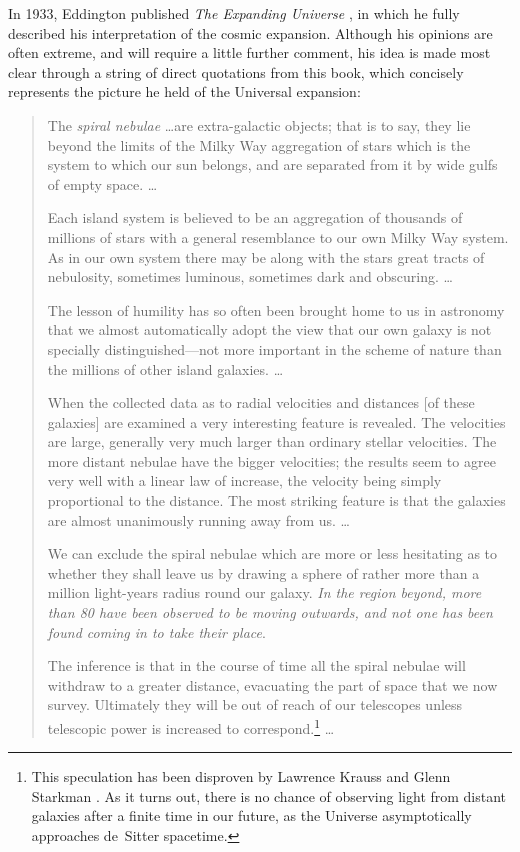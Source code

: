 In 1933, Eddington published \textit{The Expanding Universe} \cite{Eddington1933}, in which he fully described his interpretation of the cosmic expansion. Although his opinions are often extreme, and will require a little further comment, his idea is made most clear through a string of direct quotations from this book, which concisely represents the picture he held of the Universal expansion:
\begin{quotation}
The \textit{spiral nebulae} \ldots are extra-galactic objects; that is to say, they lie beyond the limits of the Milky Way aggregation of stars which is the system to which our sun belongs, and are separated from it by wide gulfs of empty space. \ldots

Each island system is believed to be an aggregation of thousands of millions of stars with a general resemblance to our own Milky Way system. As in our own system there may be along with the stars great tracts of nebulosity, sometimes luminous, sometimes dark and obscuring. \ldots

The lesson of humility has so often been brought home to us in astronomy that we almost automatically adopt the view that our own galaxy is not specially distinguished---not more important in the scheme of nature than the millions of other island galaxies. \ldots

When the collected data as to radial velocities and distances [of these galaxies] are examined a very interesting feature is revealed. The velocities are large, generally very much larger than ordinary stellar velocities. The more distant nebulae have the bigger velocities; the results seem to agree very well with a linear law of increase, the velocity being simply proportional to the distance. The most striking feature is that the galaxies are almost unanimously running away from us. \ldots

We can exclude the spiral nebulae which are more or less hesitating as to whether they shall leave us by drawing a sphere of rather more than a million light-years radius round our galaxy. \textit{In the region beyond, more than 80 have been observed to be moving outwards, and not one has been found coming in to take their place}.

The inference is that in the course of time all the spiral nebulae will withdraw to a greater distance, evacuating the part of space that we now survey. Ultimately they will be out of reach of our telescopes unless telescopic power is increased to correspond.\footnote{This speculation has been disproven by Lawrence Krauss and Glenn Starkman \cite{Krauss2000}. As it turns out, there is no chance of observing light from distant galaxies after a finite time in our future, as the Universe asymptotically approaches de~Sitter spacetime.} \ldots


\end{quotation}
